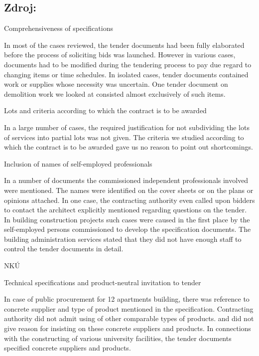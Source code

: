 \documentclass[10pt]{article}
\begin{document}
\subsection*{Zdroj:}



Comprehensiveness of specifications

In most of the cases reviewed, the tender documents had been fully elaborated before the process of soliciting bids was launched.
However in various cases, documents had to be modified during the tendering process to pay due regard to changing items or time schedules.
In isolated cases, tender documents contained work or supplies whose necessity was uncertain.
One tender document on demolition work we looked at consisted almost exclusively of such items.


Lots and criteria according to which the contract is to be awarded

In a large number of cases, the required justification for not subdividing the lots of services into partial lots was not given.
The criteria we studied according to which the contract is to be awarded gave us no reason to point out shortcomings.


Inclusion of names of self-employed professionals

In a number of documents the commissioned independent professionals involved were mentioned.
The names were identified on the cover sheets or on the plans or opinions attached.
In one case, the contracting authority even called upon bidders to contact the architect explicitly mentioned regarding questions on the tender.
In building construction projects such cases were caused in the first place by the self-employed persons commissioned to develop the specification documents.
The building administration services stated that they did not have enough staff to control the tender documents in detail.


NKÚ



Technical specifications and product-neutral invitation to tender

In case of public procurement for 12 apartments building, there was reference to concrete supplier and type of product mentioned in the specification.
Contracting authority did not admit using of other comparable types of products. and did not give reason for insisting on these concrete suppliers and products.
In connections with the constructing of various university facilities, the tender documents specified concrete suppliers and products.
\end{document}
